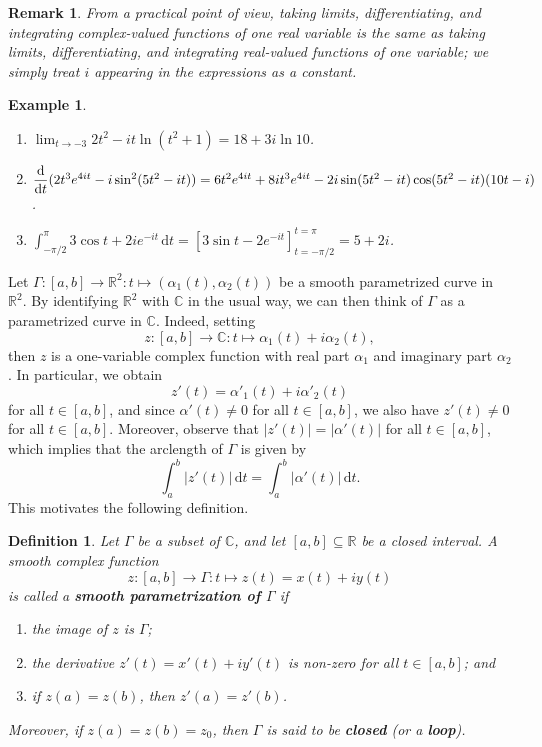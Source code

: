 \documentclass[10pt]{article}
\newcommand{\R}{\mathbb{R}}
\newcommand{\C}{\mathbb{C}}
\newcommand{\dd}{\,\mathrm{d}}
\theoremstyle{newstyle}
\newtheorem{remark}[thm]{Remark}
\newtheorem{defn}[thm]{Definition}
\newtheorem{exmp}[thm]{Example}
\begin{document}
\begin{remark}
From a practical point of view, taking limits, differentiating, and integrating {\it complex-valued} 
functions of one real variable is the same as taking limits, differentiating, and 
integrating {\it real-valued} functions of one variable; we simply treat $i$ appearing 
in the expressions as a constant. 
\end{remark}

\begin{exmp}~
\begin{enumerate}[(1)]
    \item $\lim_{t\to-3} 2t^2 - it \ln(t^2+1) = 18 + 3i\ln{10}$.
    \item $\dfrac{\rm d}{{\rm d}t} (2t^3 e^{4it} - i \sin^2(5t^2 - it)) 
    = 6t^2 e^{4it} + 8it^3 e^{4it} - 2i\sin(5t^2 - it) \cos(5t^2 - it) (10t - i)$.
    \item $\displaystyle\int_{-\pi/2}^\pi 3\cos t + 2ie^{-it} \dd t = \left[3\sin t - 2e^{-it}\right]_{t=-\pi/2}^{t=\pi}
    = 5 + 2i$.
\end{enumerate}
\end{exmp}

Let $\Gamma : [a, b] \to \R^2 : t \mapsto (\alpha_1(t), \alpha_2(t))$ be a smooth parametrized 
curve in $\R^2$. By identifying $\R^2$ with $\C$ in the usual way, we can then think of 
$\Gamma$ as a parametrized curve in $\C$. Indeed, setting 
\[ z : [a, b] \to \C : t \mapsto \alpha_1(t) + i\alpha_2(t), \]
then $z$ is a one-variable complex function with real part $\alpha_1$ and imaginary part $\alpha_2$.
In particular, we obtain 
\[ z'(t) = \alpha'_1(t) + i\alpha'_2(t) \]
for all $t \in [a, b]$, and since $\alpha'(t) \neq 0$ for all $t \in [a, b]$, we also have 
$z'(t) \neq 0$ for all $t \in [a, b]$. Moreover, observe that 
$|z'(t)| = |\alpha'(t)|$ for all $t \in [a, b]$, which implies that the arclength of $\Gamma$ 
is given by 
\[ \int_a^b |z'(t)|\dd t = \int_a^b |\alpha'(t)| \dd t. \]
This motivates the following definition. 

\begin{defn}
Let $\Gamma$ be a subset of $\C$, and let $[a, b] \subseteq \R$ be a closed interval. 
A smooth complex function 
\[ z : [a, b] \to \Gamma : t \mapsto z(t) = x(t) + iy(t) \]
is called a {\bf smooth parametrization of $\Gamma$} if 
\begin{enumerate}[(1)]
    \item the image of $z$ is $\Gamma$;
    \item the derivative $z'(t) = x'(t) + iy'(t)$ is non-zero for all $t \in [a, b]$; and 
    \item if $z(a) = z(b)$, then $z'(a) = z'(b)$.
\end{enumerate}
Moreover, if $z(a) = z(b) = z_0$, then $\Gamma$ is said to be {\bf closed} (or a {\bf loop}).
\end{defn}
\end{document}
